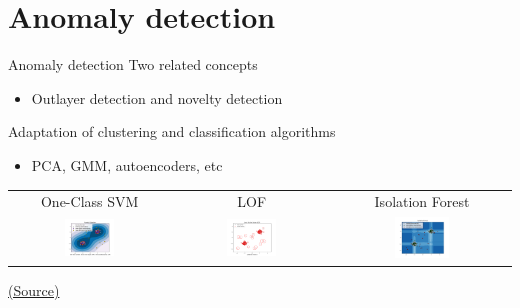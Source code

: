\documentclass[10pt,compress]{beamer} %
\begin{document}
\section{Anomaly detection}

\begin{frame}{Anomaly detection}
    Two related concepts
    \begin{itemize}
        \item Outlayer detection and novelty detection
    \end{itemize}

    Adaptation of clustering and classification algorithms
    \begin{itemize}
        \item PCA, GMM, autoencoders, etc
    \end{itemize}

	\begin{center}
	\begin{tabular}{ccc}
	 	One-Class SVM & LOF    & Isolation Forest \\
	    \includegraphics[width=0.33\textwidth]{figs/oneclasssvm.png} &
	    \includegraphics[width=0.33\textwidth]{figs/lof.png} &
	    \includegraphics[width=0.33\textwidth]{figs/isolationforest.png} \\
	\end{tabular}
	\end{center}
	\centering \scriptsize\href{https://scikit-learn.org/stable/modules/outlier_detection.html}{(Source)}
\end{frame}
\end{document}
